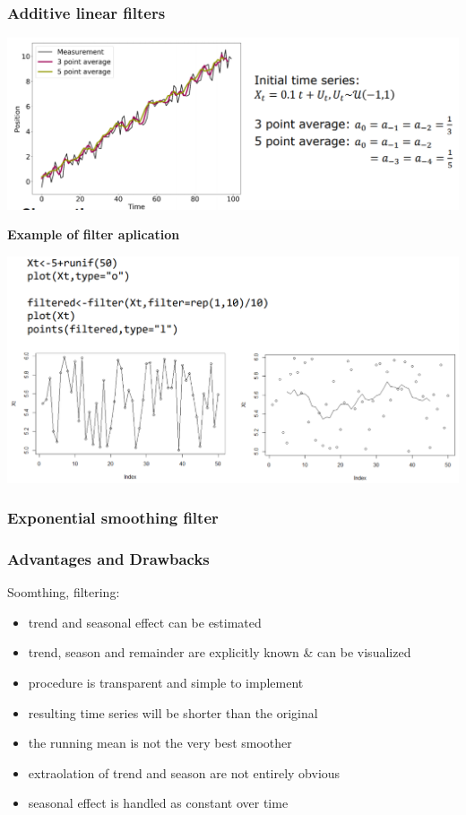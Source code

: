 \documentclass[
]{article}
\begin{document}
\hypertarget{additive-linear-filters}{%
\subsubsection{Additive linear filters}\label{additive-linear-filters}}

\includegraphics[width=1\linewidth]{avg}

\textbf{Example of filter aplication}

\includegraphics[width=1\linewidth]{filter_ex}

\hypertarget{exponential-smoothing-filter}{%
\subsubsection{Exponential smoothing
filter}\label{exponential-smoothing-filter}}

\hypertarget{advantages-and-drawbacks}{%
\subsubsection{Advantages and
Drawbacks}\label{advantages-and-drawbacks}}

Soomthing, filtering:

\begin{itemize}
\item
  trend and seasonal effect can be estimated
\item
  trend, season and remainder are explicitly known \& can be visualized
\item
  procedure is transparent and simple to implement
\item
  resulting time series will be shorter than the original
\item
  the running mean is not the very best smoother
\item
  extraolation of trend and season are not entirely obvious
\item
  seasonal effect is handled as constant over time
\end{itemize}
\end{document}
